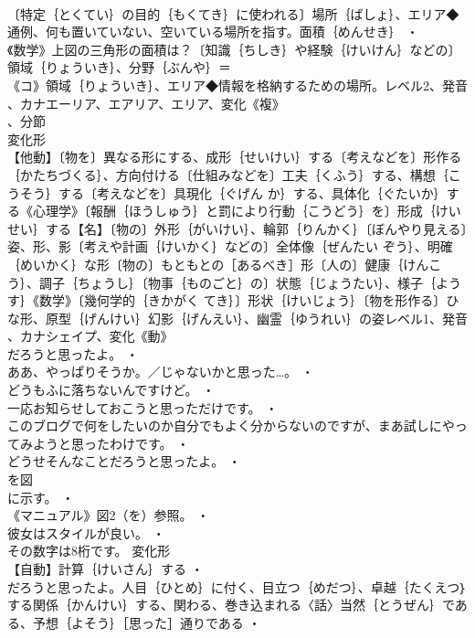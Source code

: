 \documentclass[8pt]{extreport}
\begin{document}
\begin{CJK}{UTF8}{min}
\\	〔特定｛とくてい｝の目的｛もくてき｝に使われる〕場所｛ばしょ｝、エリア◆通例、何も置いていない、空いている場所を指す。面積｛めんせき｝ ・
\\	《数学》上図の三角形の面積は？〔知識｛ちしき｝や経験｛けいけん｝などの〕領域｛りょういき｝、分野｛ぶんや｝＝ 
\\	《コ》領域｛りょういき｝、エリア◆情報を格納するための場所。レベル2、発音
\\	、カナエーリア、エアリア、エリア、変化《複》
\\	、分節
\\	変化形 
\\	【他動】〔物を〕異なる形にする、成形｛せいけい｝する〔考えなどを〕形作る｛かたちづくる｝、方向付ける〔仕組みなどを〕工夫｛くふう｝する、構想｛こうそう｝する〔考えなどを〕具現化｛ぐげん か｝する、具体化｛ぐたいか｝する《心理学》〔報酬｛ほうしゅう｝と罰により行動｛こうどう｝を〕形成｛けいせい｝する【名】〔物の〕外形｛がいけい｝、輪郭｛りんかく｝〔ぼんやり見える〕姿、形、影〔考えや計画｛けいかく｝などの〕全体像｛ぜんたい ぞう｝、明確｛めいかく｝な形〔物の〕もともとの［あるべき］形〔人の〕健康｛けんこう｝、調子｛ちょうし｝〔物事｛ものごと｝の〕状態｛じょうたい｝、様子｛ようす｝《数学》〔幾何学的｛きかがく てき｝〕形状｛けいじょう｝〔物を形作る〕ひな形、原型｛げんけい｝幻影｛げんえい｝、幽霊｛ゆうれい｝の姿レベル1、発音
\\	、カナシェイプ、変化《動》
\\	だろうと思ったよ。 ・
\\	ああ、やっぱりそうか。／じゃないかと思った…。 ・
\\	どうもふに落ちないんですけど。 ・
\\	一応お知らせしておこうと思っただけです。 ・
\\	このブログで何をしたいのか自分でもよく分からないのですが、まあ試しにやってみようと思ったわけです。 ・
\\	どうせそんなことだろうと思ったよ。 ・
\\	を図
\\	に示す。 ・
\\	《マニュアル》図2（を）参照。 ・
\\	彼女はスタイルが良い。 ・
\\	その数字は8桁です。	変化形 
\\	【自動】計算｛けいさん｝する ・
\\	だろうと思ったよ。人目｛ひとめ｝に付く、目立つ｛めだつ｝、卓越｛たくえつ｝する関係｛かんけい｝する、関わる、巻き込まれる〈話〉当然｛とうぜん｝である、予想｛よそう｝［思った］通りである ・

\end{CJK}
\end{document}
